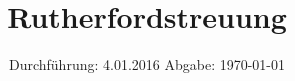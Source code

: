 

\subject{V16}
\title{Rutherfordstreuung}
\date{
  Durchführung: 4.01.2016
  \hspace{3em}
  Abgabe: \today
}



\maketitle
\thispagestyle{empty}
\tableofcontents
\newpage



% 
% 

\printbibliography


